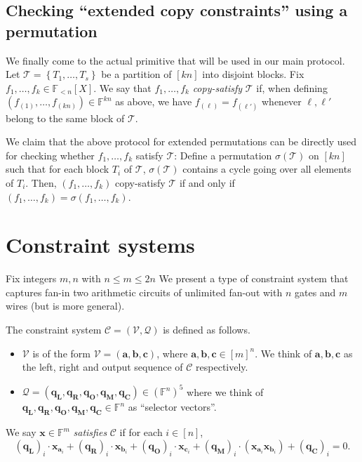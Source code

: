 \documentclass[11pt]{article} %
\newcommand{\F}{\ensuremath{\mathbb F}\xspace}
\newcommand{\sigof}[1]{\ensuremath{\sigma(#1)}\xspace}
\newcommand{\partition}{\ensuremath{{\mathcal T}}\xspace}
\newcommand{\set}[1]{\ensuremath{\left\{#1\right\}}\xspace}
\newcommand{\polysofdeg}[1]{\ensuremath{\F_{< #1}[X]}\xspace}
\newcommand{\selleft}{\ensuremath{\mathbf{q_L}}\xspace}
\newcommand{\selright}{\ensuremath{\mathbf{q_R}}\xspace}
\newcommand{\selout}{\ensuremath{\mathbf{q_O}}\xspace}
\newcommand{\selmult}{\ensuremath{\mathbf{q_M}}\xspace}
\newcommand{\selconst}{\ensuremath{\mathbf{q_C}}\xspace}
\newcommand{\selectors}{\ensuremath{\mathcal{Q}}\xspace}
\newcommand{\lvar}{\ensuremath{\mathbf{a}}\xspace}
\newcommand{\vars}{\ensuremath{\mathcal{V}}\xspace}
\newcommand{\rvar}{\ensuremath{\mathbf{b}}\xspace}
\newcommand{\ovar}{\ensuremath{\mathbf{c}}\xspace}
\newcommand{\assignment}{\ensuremath{\mathbf{x}}\xspace}
\newcommand{\constsystem}{\ensuremath{\mathscr{C}}\xspace}
\newtheorem{claim}[lemma]{Claim}
\begin{document}
\subsection{Checking ``extended copy constraints'' using a permutation}\label{subsec:copychecks}
We finally come to the actual primitive that will be used in our main protocol.
Let $\partition= \set{T_1,\ldots,T_s}$ be a partition of $[kn]$ into disjoint blocks.
Fix $f_1,\ldots,f_k\in \polysofdeg{n}$.
We say that $f_1,\ldots,f_k$ \emph{copy-satisfy} \partition if, when defining $(f_{(1)},\ldots,f_{(kn)})\in \F^{kn}$ as above, we have 
$f_{(\ell)} = f_{(\ell')}$ whenever $\ell,\ell'$ belong to the same block
 of \partition.

 
 
We claim that the above protocol for extended permutations can be directly used for checking whether $f_1,\ldots,f_k$ satisfy \partition:
Define a permutation $\sigof{\partition}$ on $[kn]$ such that for each block $T_i$ of \partition, $\sigof{\partition}$ contains a cycle going over all elements of $T_i$.
Then, $(f_1,\ldots,f_k)$ copy-satisfy \partition if and only if 
$(f_1,\ldots,f_k) = \sigma(f_1,\ldots,f_k)$.


\section{Constraint systems}\label{sec:constsystems}
Fix integers $m,n$ with $n\leq m\leq 2n$
We present a type of constraint system that captures fan-in two arithmetic circuits of unlimited fan-out with $n$ gates and $m$ wires (but is more general).

The constraint system $\constsystem=(\vars,\selectors)$ is defined as follows.
\begin{itemize}
 \item \vars is of the form $\vars=(\lvar,\rvar,\ovar)$,  where $\lvar,\rvar,\ovar \in [m]^n$. We think of $\lvar,\rvar,\ovar$ as the left, right and output sequence of \constsystem respectively.
\item $\selectors = (\selleft,\selright,\selout,\selmult,\selconst)\in (\F^n)^5$ where we think of $\selleft,\selright,\selout,\selmult,\selconst \in \F^n$ as ``selector vectors''.
\end{itemize}
We say $\assignment \in \F^{m}$ \emph{satisfies} \constsystem if for each $i\in [n]$,
\[(\selleft)_i\cdot \assignment_{\lvar_i} + (\selright)_i \cdot \assignment_{\rvar_i} + (\selout)_i \cdot \assignment_{\ovar_i} + (\selmult)_i\cdot (\assignment_{\lvar_i}\assignment_{\rvar_i}) + (\selconst)_i =0.\]
\end{document}

